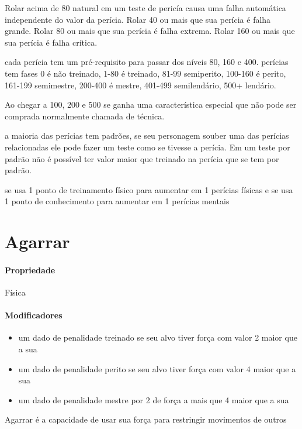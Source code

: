 Rolar acima de 80 natural em um teste de pericía causa uma
falha automática independente do valor da perícia.
Rolar 40 ou mais que sua perícia é falha grande.
Rolar 80 ou mais que sua perícia é falha extrema.
Rolar 160 ou mais que sua perícia é falha crítica.

cada perícia tem um pré-requisito para passar dos níveis 80, 160 e 400.
perícias tem fases 0 é não treinado, 1-80 é treinado,
81-99 semiperito, 100-160 é perito,
161-199 semimestre, 200-400 é mestre,
401-499 semilendário, 500+ lendário.

Ao chegar a 100, 200 e 500 se ganha uma característica especial
que não pode ser comprada normalmente chamada de técnica.

a maioria das perícias tem padrões, se seu personagem
souber uma das perícias relacionadas ele pode fazer um teste
como se tivesse a perícia. Em um teste por padrão
não é possível ter valor maior que treinado na perícia que
se tem por padrão.

se usa 1 ponto de treinamento físico para aumentar em 1 perícias físicas
e se usa 1 ponto de conhecimento para aumentar em 1 perícias mentais
\section{Agarrar}
\paragraph{Propriedade} Física
\paragraph{Modificadores}
\begin{itemize}
  \item um dado de penalidade treinado se seu alvo tiver força com valor 2 maior que a sua
  \item um dado de penalidade perito se seu alvo tiver força com valor 4 maior que a sua
  \item um dado de penalidade mestre por 2 de força a mais que 4 maior que a sua
\end{itemize}
Agarrar é a capacidade de usar sua força para restringir movimentos de outros
